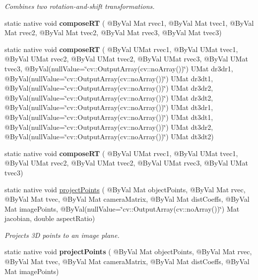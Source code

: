 \begin{DoxyCompactItemize}
\begin{DoxyCompactList}\small\item\em Combines two rotation-\/and-\/shift transformations. \end{DoxyCompactList}\item 
static native void {\bfseries compose\+RT} ( @By\+Val Mat rvec1, @By\+Val Mat tvec1, @By\+Val Mat rvec2, @By\+Val Mat tvec2, @By\+Val Mat rvec3, @By\+Val Mat tvec3)
\item 
static native void {\bfseries compose\+RT} ( @By\+Val U\+Mat rvec1, @By\+Val U\+Mat tvec1, @By\+Val U\+Mat rvec2, @By\+Val U\+Mat tvec2, @By\+Val U\+Mat rvec3, @By\+Val U\+Mat tvec3, @By\+Val(null\+Value=\char`\"{}cv\+::\+Output\+Array(cv\+::no\+Array())\char`\"{}) U\+Mat dr3dr1, @By\+Val(null\+Value=\char`\"{}cv\+::\+Output\+Array(cv\+::no\+Array())\char`\"{}) U\+Mat dr3dt1, @By\+Val(null\+Value=\char`\"{}cv\+::\+Output\+Array(cv\+::no\+Array())\char`\"{}) U\+Mat dr3dr2, @By\+Val(null\+Value=\char`\"{}cv\+::\+Output\+Array(cv\+::no\+Array())\char`\"{}) U\+Mat dr3dt2, @By\+Val(null\+Value=\char`\"{}cv\+::\+Output\+Array(cv\+::no\+Array())\char`\"{}) U\+Mat dt3dr1, @By\+Val(null\+Value=\char`\"{}cv\+::\+Output\+Array(cv\+::no\+Array())\char`\"{}) U\+Mat dt3dt1, @By\+Val(null\+Value=\char`\"{}cv\+::\+Output\+Array(cv\+::no\+Array())\char`\"{}) U\+Mat dt3dr2, @By\+Val(null\+Value=\char`\"{}cv\+::\+Output\+Array(cv\+::no\+Array())\char`\"{}) U\+Mat dt3dt2)
\item 
static native void {\bfseries compose\+RT} ( @By\+Val U\+Mat rvec1, @By\+Val U\+Mat tvec1, @By\+Val U\+Mat rvec2, @By\+Val U\+Mat tvec2, @By\+Val U\+Mat rvec3, @By\+Val U\+Mat tvec3)
\item 
static native void \hyperlink{group__calib3d_gaa19528257b52c058dffc58aba4f6d751}{project\+Points} ( @By\+Val Mat object\+Points, @By\+Val Mat rvec, @By\+Val Mat tvec, @By\+Val Mat camera\+Matrix, @By\+Val Mat dist\+Coeffs, @By\+Val Mat image\+Points, @By\+Val(null\+Value=\char`\"{}cv\+::\+Output\+Array(cv\+::no\+Array())\char`\"{}) Mat jacobian, double aspect\+Ratio)
\begin{DoxyCompactList}\small\item\em Projects 3D points to an image plane. \end{DoxyCompactList}\item 
static native void {\bfseries project\+Points} ( @By\+Val Mat object\+Points, @By\+Val Mat rvec, @By\+Val Mat tvec, @By\+Val Mat camera\+Matrix, @By\+Val Mat dist\+Coeffs, @By\+Val Mat image\+Points)
\item 

\end{DoxyCompactItemize}

